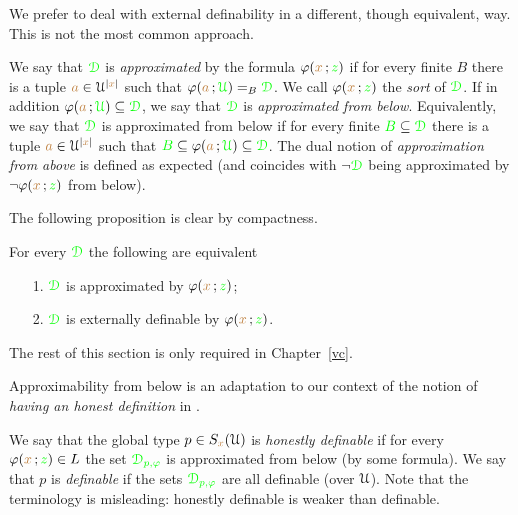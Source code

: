\documentclass[creche.tex]{subfiles}
\begin{document}
\noindent\llap{\textcolor{red}{\Large\danger}\kern1.5ex}We prefer to deal with external definability in a different, though equivalent, way.
This is not the most common approach.

\begin{definition}\label{def_approx}
We say that ${\color{green}\EuScript D}$ is \emph{approximated\/} by the formula $\varphi({\color{brown} x}\,;{\color{green} z})$ if for every finite $B$ there is a tuple ${\color{brown} a}\in\EuScript U^{|{\color{brown} x}|}$ such that $\varphi({\color{brown} a}\,;{\color{green}\EuScript U})=_B{\color{green}\EuScript D}$.
We call $\varphi({\color{brown} x}\,;{\color{green} z})$ the \emph{sort} of ${\color{green}\EuScript D}$.
If in addition $\varphi({\color{brown} a}\,;{\color{green}\EuScript U})\subseteq{\color{green}\EuScript D}$, we say that  ${\color{green}\EuScript D}$ is \emph{approximated from below}.
Equivalently, we say that  ${\color{green}\EuScript D}$ is approximated from below if for every finite ${\color{green} B}\subseteq{\color{green}\EuScript D}$ there is a tuple ${\color{brown} a}\in\EuScript U^{|{\color{brown} x}|}$ such that  ${\color{green} B}\subseteq\varphi({\color{brown} a}\,;{\color{green}\EuScript U})\subseteq{\color{green}\EuScript D}$.
The dual notion of \emph{approximation from above\/} is defined as expected (and coincides with $\neg{\color{green}\EuScript D}$ being approximated by $\neg\varphi({\color{brown} x}\,;{\color{green} z})$ from below).\QED
\end{definition} 

The following proposition is clear by compactness.

\begin{proposition}\label{prop_approx=external}
   For every ${\color{green}\EuScript D}$ the following are equivalent
   \begin{itemize}
   \item[1.] ${\color{green}\EuScript D}$ is approximated by $\varphi({\color{brown} x}\,;{\color{green} z})$;
   \item[2.] ${\color{green}\EuScript D}$ is externally definable by $\varphi({\color{brown} x}\,;{\color{green} z})$.\QED
   \end{itemize}
\end{proposition}

The rest of this section is only required in Chapter~\ref{vc}.

Approximability from below is an adaptation to our context of the notion of \textit{having an honest definition} in \cite{CS}.

\begin{definition}\label{def_defble_type}
We say that the global type $p\in S_{{\color{brown} x}}(\EuScript U)$ is \emph{honestly definable\/} if for every $\varphi({\color{brown} x}\,;{\color{green} z})\in L$ the set ${\color{green}\EuScript D_{p,\varphi}}$ is approximated from below (by some formula).
We say that $p$ is \emph{definable\/} if the sets ${\color{green}\EuScript D_{p,\varphi}}$ are all definable (over $\EuScript U$).
Note that the terminology is misleading: honestly definable is weaker than definable.
\end{definition}
\end{document}
